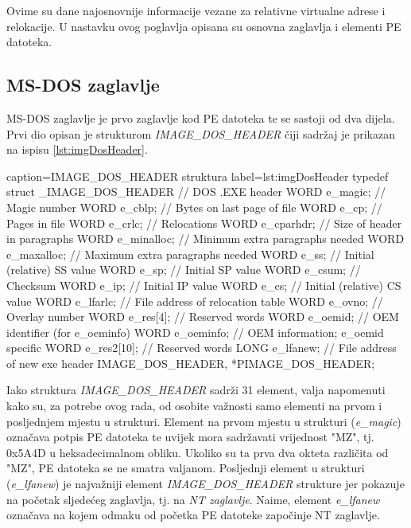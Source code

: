 \documentclass[times, utf8, diplomski, numeric]{fer}
\begin{document}
Ovime su dane najosnovnije informacije vezane za relativne
virtualne adrese i relokacije. U nastavku ovog poglavlja opisana
su osnovna zaglavlja i elementi PE datoteka.


\subsection{MS-DOS zaglavlje}

MS-DOS zaglavlje je prvo zaglavlje kod PE datoteka te se sastoji
od dva dijela. Prvi dio opisan je strukturom
\emph{IMAGE\_DOS\_HEADER} čiji sadržaj je prikazan na ispisu \ref{lst:imgDosHeader}.

\begin{struktura} {caption=IMAGE\_DOS\_HEADER struktura} {label=lst:imgDosHeader}
typedef struct _IMAGE_DOS_HEADER {      // DOS .EXE header
	WORD   e_magic;                     // Magic number
	WORD   e_cblp;                      // Bytes on last page of file
	WORD   e_cp;                        // Pages in file
	WORD   e_crlc;                      // Relocations
	WORD   e_cparhdr;                   // Size of header in paragraphs
	WORD   e_minalloc;                  // Minimum extra paragraphs needed
	WORD   e_maxalloc;                  // Maximum extra paragraphs needed
	WORD   e_ss;                        // Initial (relative) SS value
	WORD   e_sp;                        // Initial SP value
	WORD   e_csum;                      // Checksum
	WORD   e_ip;                        // Initial IP value
	WORD   e_cs;                        // Initial (relative) CS value
	WORD   e_lfarlc;                    // File address of relocation table
	WORD   e_ovno;                      // Overlay number
	WORD   e_res[4];                    // Reserved words
	WORD   e_oemid;                     // OEM identifier (for e_oeminfo)
	WORD   e_oeminfo;                   // OEM information; e_oemid specific
	WORD   e_res2[10];                  // Reserved words
	LONG   e_lfanew;                    // File address of new exe header
} IMAGE_DOS_HEADER, *PIMAGE_DOS_HEADER;
\end{struktura}

Iako struktura \emph{IMAGE\_DOS\_HEADER} sadrži 31 element, valja
napomenuti kako su, za potrebe ovog rada, od osobite važnosti
samo elementi na prvom i posljednjem mjestu u strukturi. Element
na prvom mjestu u strukturi (\emph{e\_magic}) označava potpis PE
datoteka te uvijek mora sadržavati vrijednost "MZ", tj. 0x5A4D u
heksadecimalnom obliku. Ukoliko su ta prva dva okteta različita
od "MZ", PE datoteka se ne smatra valjanom. Posljednji element u
strukturi (\emph{e\_lfanew}) je najvažniji element
\emph{IMAGE\_DOS\_HEADER} strukture jer pokazuje na početak
sljedećeg zaglavlja, tj. na \emph{NT zaglavlje}. Naime, element 
\emph{e\_lfanew} označava na kojem odmaku od početka PE datoteke
započinje NT zaglavlje.
\end{document}
